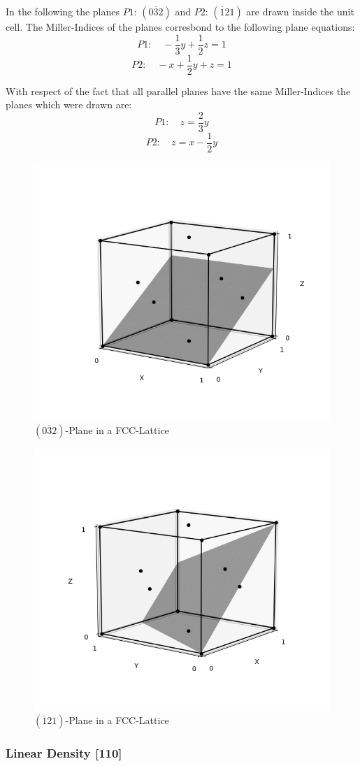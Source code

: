 In the following the planes $P1: \, (0\overline{3}2)$ and $P2: \,(\overline{1}21)$ are drawn inside the unit cell.
The Miller-Indices of the planes corresbond to the following plane equations:
$$P1: \quad -\frac{1}{3} y + \frac{1}{2} z = 1$$
$$P2: \quad -x +\frac{1}{2} y + z = 1$$

With respect of the fact that all parallel planes have the same Miller-Indices the planes which were drawn are:
$$P1: \quad z = \frac{2}{3}y$$
$$P2: \quad z = x -\frac{1}{2}y$$

\begin{figure}[H]
	\centering
	\includegraphics[width=0.6\linewidth]{Graphics/Chapter1/PLANE032}
	\caption{$(0\overline{3}2)$-Plane in a FCC-Lattice}
	\label{}
\end{figure}


\begin{figure}[H]
	\centering
	\includegraphics[width=0.6\linewidth]{Graphics/Chapter1/PLANE121}
	\caption{$(\overline{1}21)$-Plane in a FCC-Lattice}
	\label{}
\end{figure}


\subsubsection*{Linear Density [110]}

